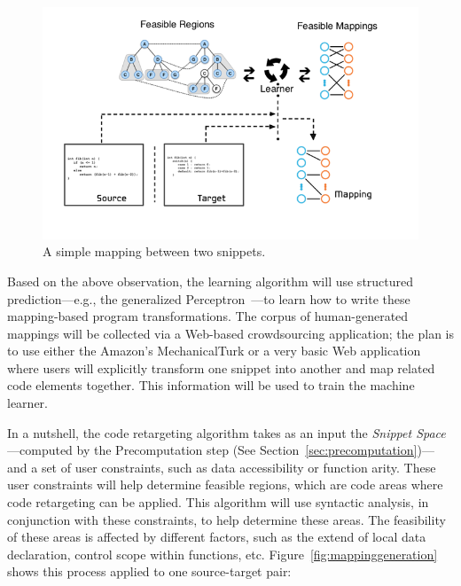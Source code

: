 \begin{figure}[!ht]
    \centering
    \includegraphics[width=\textwidth]{images/mappinggeneration}
    \caption{A simple mapping between two snippets.}
    \label{fig:mapping}
\end{figure}

Based on the above observation, the learning algorithm will use structured prediction---e.g., the generalized Perceptron~\cite{Collins:2002uo}---to learn how to write these mapping-based program transformations. The corpus of human-generated mappings will be collected via a Web-based crowdsourcing application; the plan is to use either the Amazon's MechanicalTurk or a very basic Web application where users will explicitly transform one snippet into another and map related code elements together. This information will be used to train the machine learner.

In a nutshell, the code retargeting algorithm takes as an input the \emph{Snippet Space}---computed by the Precomputation step (See Section~\ref{sec:precomputation})---and a set of user constraints, such as data accessibility or function arity. These user constraints will help determine feasible regions, which are code areas where code retargeting can be applied. This algorithm will use syntactic analysis, in conjunction with these constraints, to help determine these areas. The feasibility of these areas is affected by different factors, such as the extend of local data declaration, control scope within functions, etc. Figure~\ref{fig:mappinggeneration} shows this process applied to one source-target pair:

